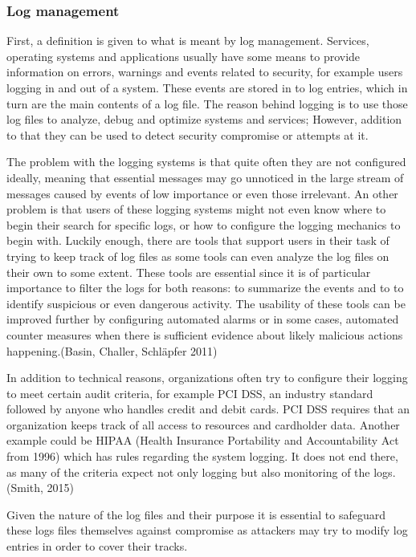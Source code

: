 \documentclass{article}
\begin{document}
\subsubsection{Log management}
First, a definition is given to what is meant by log management. Services, operating systems and applications usually have some means to provide information on errors, warnings and events related to security, for example users logging in and out of a system. These events are stored in to log entries, which in turn are the main contents of a log file. The reason behind logging is to use those log files to analyze, debug and optimize systems and services; However, addition to that they can be used to detect security compromise or attempts at it.
\par
The problem with the logging systems is that quite often they are not configured ideally, meaning that essential messages may go unnoticed in the large stream of messages caused by events of low importance or even those irrelevant. An other problem is that users of these logging systems might not even know where to begin their search for specific logs, or how to configure the logging mechanics to begin with. Luckily enough, there are tools that support users in their task of trying to keep track of log files as some tools can even analyze the log files on their own to some extent. These tools are essential since it is of particular importance to filter the logs for both reasons: to summarize the events and to to identify suspicious or even dangerous activity. The usability of these tools can be improved further by configuring automated alarms or in some cases, automated counter measures when there is sufficient evidence about likely malicious actions happening.(Basin, Challer, Schläpfer 2011)
\par
In addition to technical reasons, organizations often try to configure their logging to meet certain audit criteria, for example PCI DSS, an industry standard followed by anyone who handles credit and debit cards. PCI DSS requires that an organization keeps track of all access to resources and cardholder data. Another example could be HIPAA (Health Insurance Portability and Accountability Act from 1996) which has rules regarding the system logging. It does not end there, as many of the criteria expect not only logging but also monitoring of the logs.(Smith, 2015)
\par
Given the nature of the log files and their purpose it is essential to safeguard these logs files themselves against compromise as attackers may try to modify log entries in order to cover their tracks.
\end{document}
